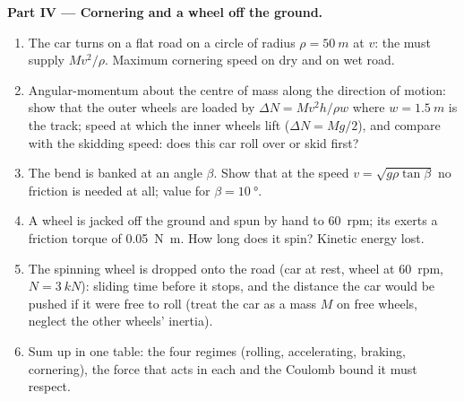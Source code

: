 \begin{problem}
\medskip
\noindent\textbf{Part IV --- Cornering and a wheel off the ground.}
\begin{enumerate}[resume]
  \item The car turns on a flat road on a circle of radius
        $\rho = \qty{50}{m}$ at $v$: the  must supply
        $Mv^2/\rho$. Maximum cornering speed on dry and on wet road.
  \item Angular-momentum about the centre of mass along the direction of
        motion: show that the outer wheels are loaded by $\Delta N =
        Mv^2h/\rho w$ where $w = \qty{1.5}{m}$ is the track; speed at
        which the inner wheels lift ($\Delta N = Mg/2$), and compare
        with the skidding speed: does this car roll over or skid first?
  \item The bend is banked at an angle $\beta$. Show that at the speed
        $v = \sqrt{g\rho\tan\beta}$ no friction is needed at all; value
        for $\beta = \qty{10}{\degree}$.
  \item A wheel is jacked off the ground and spun by hand to
        \qty{60}{rpm}; its  exerts a friction torque of
        \qty{0.05}{N.m}. How long does it spin? Kinetic energy lost.
  \item The spinning wheel is dropped onto the road (car at rest, wheel
        at \qty{60}{rpm}, $N = \qty{3}{kN}$): sliding time before it stops,
        and the distance the car would be pushed if it were free to
        roll (treat the car as a mass $M$ on free wheels, neglect the
        other wheels' inertia).
  \item Sum up in one table: the four regimes (rolling, accelerating,
        braking, cornering), the force that acts in each and the
        Coulomb bound it must respect.
\end{enumerate}
\end{problem}
